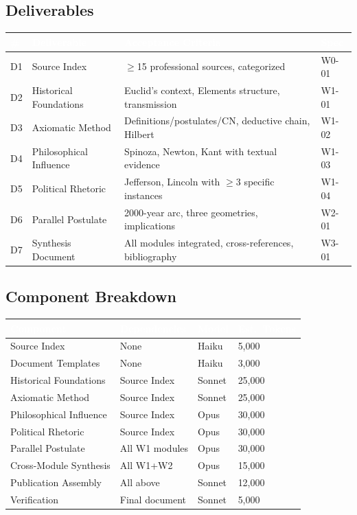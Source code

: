 \documentclass[11pt,letterpaper]{article}
\newcommand{\tableheader}[1]{\textbf{\sffamily\textcolor{white}{#1}}}
\begin{document}
\subsection{Deliverables}

\begin{center}
\begin{tabularx}{\textwidth}{C{0.8cm}L{4cm}XC{1.5cm}}
\toprule
{}
\tableheader{\#} & \tableheader{Deliverable} & \tableheader{Acceptance Criteria} & \tableheader{Spec} \\
\midrule
D1 & Source Index & $\geq$15 professional sources, categorized & W0-01 \\
D2 & Historical Foundations & Euclid's context, Elements structure, transmission & W1-01 \\
D3 & Axiomatic Method & Definitions/postulates/CN, deductive chain, Hilbert & W1-02 \\
D4 & Philosophical Influence & Spinoza, Newton, Kant with textual evidence & W1-03 \\
D5 & Political Rhetoric & Jefferson, Lincoln with $\geq$3 specific instances & W1-04 \\
D6 & Parallel Postulate & 2000-year arc, three geometries, implications & W2-01 \\
D7 & Synthesis Document & All modules integrated, cross-references, bibliography & W3-01 \\
\bottomrule
\end{tabularx}
\end{center}

\subsection{Component Breakdown}

\begin{center}
\begin{tabularx}{\textwidth}{L{3.5cm}L{2.5cm}C{1.5cm}C{2cm}}
\toprule
{}
\tableheader{Component} & \tableheader{Dependencies} & \tableheader{Model} & \tableheader{Est.\ Tokens} \\
\midrule
Source Index & None & Haiku & 5,000 \\
Document Templates & None & Haiku & 3,000 \\
Historical Foundations & Source Index & Sonnet & 25,000 \\
Axiomatic Method & Source Index & Sonnet & 25,000 \\
Philosophical Influence & Source Index & Opus & 30,000 \\
Political Rhetoric & Source Index & Opus & 30,000 \\
Parallel Postulate & All W1 modules & Opus & 30,000 \\
Cross-Module Synthesis & All W1+W2 & Opus & 15,000 \\
Publication Assembly & All above & Sonnet & 12,000 \\
Verification & Final document & Sonnet & 5,000 \\
\bottomrule
\end{tabularx}
\end{center}
\end{document}
